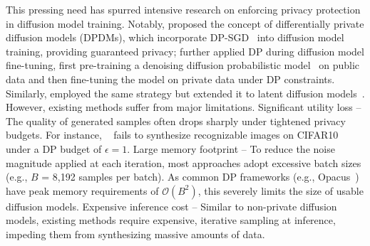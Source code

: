 This pressing need has spurred intensive research on enforcing privacy protection in diffusion model training. Notably, \citet{dockhorn2022differentially} proposed the concept of differentially private diffusion models (DPDMs), which incorporate DP-SGD~\citep{abadi2016deep} into diffusion model training, providing guaranteed privacy; \citet{ghalebikesabi2023differentially} further applied DP during diffusion model fine-tuning, first pre-training a denoising diffusion probabilistic model~\citep{ho2020denoising} on public data and then fine-tuning the model on private data under DP constraints. Similarly, \citet{lyu2023differentially} employed the same strategy but extended it to latent diffusion models~\citep{rombach2022high}. However,  existing methods suffer from major limitations.  Significant utility loss -- The quality of generated samples often drops sharply under tightened privacy budgets. For instance, \dpdm~\citep{dockhorn2022differentially} fails to synthesize recognizable images on CIFAR10 under a DP budget of $\epsilon = 1$.  Large memory footprint -- To reduce the noise magnitude applied at each iteration, most approaches adopt excessive batch sizes (e.g., $B$ = 8,192 samples per batch). As common DP frameworks (e.g., {\sc Opacus}~\citep{opacus}) have peak memory requirements of $\mathcal{O}(B^2)$, this severely limits the size of usable diffusion models.  Expensive inference cost -- Similar to non-private diffusion models, existing methods require expensive, iterative sampling at inference, impeding them from synthesizing massive amounts of data. 




